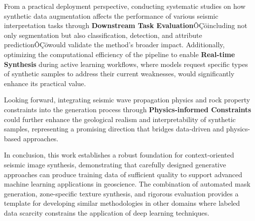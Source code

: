 ﻿\documentclass{ieeeaccess}
\begin{document}
From a practical deployment perspective, conducting systematic studies on how synthetic data augmentation affects the performance of various seismic interpretation tasks through \textbf{Downstream Task Evaluation}ÔÇöincluding not only segmentation but also classification, detection, and attribute predictionÔÇöwould validate the method's broader impact. Additionally, optimizing the computational efficiency of the pipeline to enable \textbf{Real-time Synthesis} during active learning workflows, where models request specific types of synthetic samples to address their current weaknesses, would significantly enhance its practical value.

Looking forward, integrating seismic wave propagation physics and rock property constraints into the generation process through \textbf{Physics-informed Constraints} could further enhance the geological realism and interpretability of synthetic samples, representing a promising direction that bridges data-driven and physics-based approaches.

In conclusion, this work establishes a robust foundation for context-oriented seismic image synthesis, demonstrating that carefully designed generative approaches can produce training data of sufficient quality to support advanced machine learning applications in geoscience. The combination of automated mask generation, zone-specific texture synthesis, and rigorous evaluation provides a template for developing similar methodologies in other domains where labeled data scarcity constrains the application of deep learning techniques.
\end{document}
